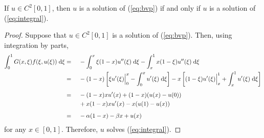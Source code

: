 \documentclass{homework}
\begin{document}
	\begin{enumerate}[label=\textbf{(\roman*)}]
		\questionpart If $u \in C^2[0,1]$, then $u$ is a solution of (\ref{eq:bvp}) if and only if $u$ is a solution of (\ref{eq:integral}).
		\begin{proof}
			Suppose that $u \in C^2[0,1]$ is a solution of (\ref{eq:bvp}). Then, using integration by parts,
			\begin{alignat*}{2}
				\int_0^1G(x,\xi)f(\xi, u(\xi))\;\text{d}\xi &{}={}&& -\int_0^x \xi(1-x)u''(\xi)\;\text{d}\xi - \int_x^1 x(1-\xi)u''(\xi)\;\text{d}\xi \\
				&{}={}&& -(1-x)\left[\xi u'(\xi)\Big\vert_0^x - \int_0^xu'(\xi)\;\text{d}\xi\right] - x\left[(1-\xi)u'(\xi)\Big\vert_x^1 + \int_x^1u'(\xi)\;\text{d}\xi\right] \\[0.5em]
				&{}={}&& -(1-x)xu'(x) + (1-x)(u(x) - u(0)) \\ 
				&&&{}+ x(1-x)xu'(x) - x(u(1) - u(x)) \\[0.5em]
				&{}={}&& -\alpha(1-x) - \beta x + u(x)
			\end{alignat*}
			for any $x \in [0,1]$. Therefore, $u$ solves (\ref{eq:integral}).
			

\end{proof}
\end{enumerate}
\end{document}
